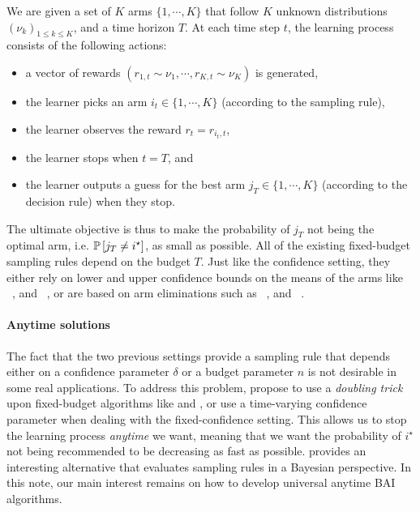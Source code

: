 \begin{definition}
\begin{leftbar}[defnbar]
	We are given a set of $K$ arms $\{1,\cdots,K\}$ that follow $K$ unknown distributions $(\nu_k)_{1 \leq k \leq K}$, and a time horizon $T$. At each time step $t$, the learning process consists of the following actions:
\begin{itemize}
	\item a vector of rewards $(r_{1,t} \sim \nu_1, \cdots, r_{K,t} \sim \nu_K)$ is generated,
	\item the learner picks an arm $i_t \in \{1,\cdots,K\}$ (according to the sampling rule),
	\item the learner observes the reward $r_t = r_{i_t, t}$,
	\item the learner stops when $t=T$, and
	\item the learner outputs a guess for the best arm $j_T \in \{1,\cdots,K\}$ (according to the decision rule) when they stop.
\end{itemize}
\end{leftbar}
\end{definition}

The ultimate objective is thus to make the probability of $j_T$ not being the optimal arm, i.e. $\mathbb{P}\left[j_T\neq i^{\star}\right]$, as small as possible. All of the existing fixed-budget sampling rules depend on the budget $T$. Just like the confidence setting, they either rely on lower and upper confidence bounds on the means of the arms like \UCBE~\citep{audibert2010budget}, and \UGapE~\citep{gabillon2012ugape}, or are based on arm eliminations such as \SR~\citep{audibert2010budget}, and \SHA~\citep{karnin2013sha}.

\paragraph{Anytime solutions}

The fact that the two previous settings provide a sampling rule that depends either on a confidence parameter $\delta$ or a budget parameter $n$ is not desirable in some real applications. To address this problem, \cite{jun2016atlucb} propose to use a \emph{doubling trick} upon fixed-budget algorithms like \SR and \SHA, or use a time-varying confidence parameter when dealing with the fixed-confidence setting. This allows us to stop the learning process \emph{anytime} we want, meaning that we want the probability of $i^{\star}$ not being recommended to be decreasing as fast as possible. \cite{russo2016ttts} provides an interesting alternative that evaluates sampling rules in a Bayesian perspective. In this note, our main interest remains on how to develop universal anytime BAI algorithms.

